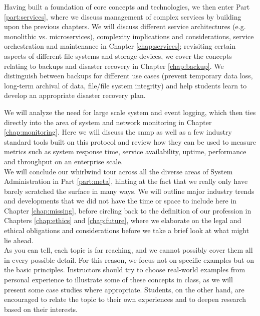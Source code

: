 Having built a foundation of core concepts and
technologies, we then enter Part \ref{part:services},
where we discuss management of complex services by
building upon the previous chapters.  We will discuss
different service architectures (e.g. monolithic vs.
microservices), complexity
implications and considerations, service orchestration
and maintenance in Chapter \ref{chap:services};
revisiting certain aspects of different file systems
and storage devices, we cover the concepts relating to
backups and disaster recovery in Chapter
\ref{chap:backup}.  We distinguish between backups for
different use cases (prevent temporary data loss,
long-term archival of data, file/file system
integrity) and help students learn to develop an
appropriate disaster recovery plan.

We will analyze the need for large scale system and
event logging, which then ties directly into the area
of system and network monitoring in Chapter
\ref{chap:monitoring}.  Here we will discuss the
\gls{snmp} as well as a few industry
standard tools built on this protocol and review how
they can be used to measure metrics such as system
response time, service availability, uptime,
performance and throughput on an enterprise scale.
\\

We will conclude our whirlwind tour across all the
diverse areas of System Administration in Part
\ref{part:meta}, hinting at the fact that we really
only have barely scratched the surface in many ways.
We will outline major industry trends and developments
that we did not have the time or space to include here
in Chapter \ref{chap:missing}, before circling back to
the definition of our profession in Chapters
\ref{chap:ethics} and \ref{chap:future}, where we
elaborate on the legal and ethical obligations and
considerations before we take a brief look at what
might lie ahead. \\

As you can tell, each topic is far reaching, and we
cannot possibly cover them all in every possible
detail.  For this reason, we focus not on specific
examples but on the basic principles.  Instructors
should try to choose real-world examples from personal
experience to illustrate some of these concepts in
class, as we will present some case studies where
appropriate.  Students, on the other hand, are
encouraged to relate the topic to their own
experiences and to deepen research based on their
interests.

